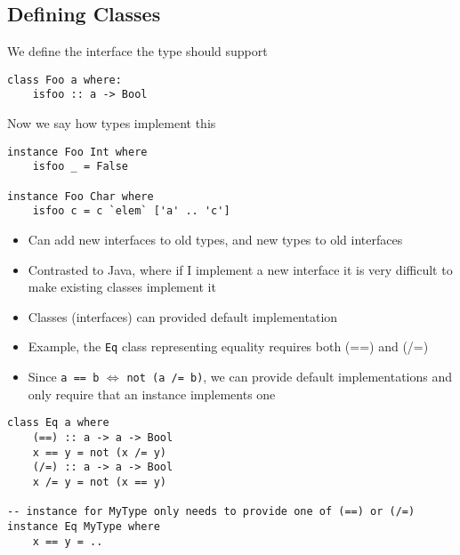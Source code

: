 \documentclass{article}[18pt]
\begin{document}
\subsection{Defining Classes}
We define the interface the type should support
\begin{verbatim}
class Foo a where:
	isfoo :: a -> Bool
\end{verbatim}
Now we say how types implement this
\begin{verbatim}
instance Foo Int where
	isfoo _ = False
	
instance Foo Char where
	isfoo c = c `elem` ['a' .. 'c']
\end{verbatim}
\begin{itemize}
	\item Can add new interfaces to old types, and new types to old interfaces
	\item Contrasted to Java, where if I implement a new interface it is very difficult to make existing classes implement it
\end{itemize}
\begin{itemize}
	\item Classes (interfaces) can provided default implementation
	\item Example, the \texttt{Eq} class representing equality requires both (==) and (/=)
	\item Since \texttt{a == b} $\Leftrightarrow$ \texttt{not (a /= b)}, we can provide default implementations and only require that an instance implements one
\end{itemize}
\begin{verbatim}
class Eq a where
	(==) :: a -> a -> Bool
	x == y = not (x /= y)
	(/=) :: a -> a -> Bool
	x /= y = not (x == y)

-- instance for MyType only needs to provide one of (==) or (/=)
instance Eq MyType where
	x == y = ..
\end{verbatim}
\end{document}
